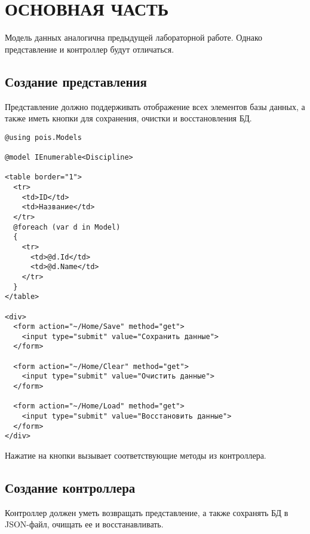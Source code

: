 \chapter{ОСНОВНАЯ ЧАСТЬ}

Модель данных аналогична предыдущей лабораторной работе. Однако представление и контроллер будут отличаться.

\section{Создание представления}

Представление должно поддерживать отображение всех элементов базы данных, а также иметь кнопки для сохранения, очистки и восстановления БД.

\begin{verbatim}
@using pois.Models

@model IEnumerable<Discipline>

<table border="1">
  <tr>
    <td>ID</td>
    <td>Название</td>
  </tr>
  @foreach (var d in Model)
  {
    <tr>
      <td>@d.Id</td>
      <td>@d.Name</td>
    </tr>
  }
</table>

<div>
  <form action="~/Home/Save" method="get">
    <input type="submit" value="Сохранить данные">
  </form>

  <form action="~/Home/Clear" method="get">
    <input type="submit" value="Очистить данные">
  </form>

  <form action="~/Home/Load" method="get">
    <input type="submit" value="Восстановить данные">
  </form>
</div>
\end{verbatim}

Нажатие на кнопки вызывает соответствующие методы из контроллера.

\section{Создание контроллера}

Контроллер должен уметь возвращать представление, а также сохранять БД в JSON-файл, очищать ее и восстанавливать. 

